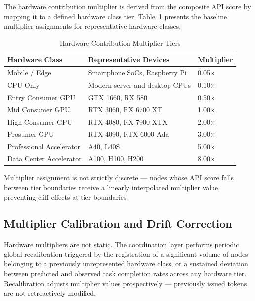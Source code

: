 \documentclass[12pt]{article}
\begin{document}
The hardware contribution multiplier is derived from the composite API score by mapping it to a defined hardware class tier. Table~\ref{tab:multipliers} presents the baseline multiplier assignments for representative hardware classes.

\begin{table}[h]
\centering
\caption{Hardware Contribution Multiplier Tiers}
\label{tab:multipliers}
\begin{tabular}{@{}lll@{}}
\toprule
\textbf{Hardware Class} & \textbf{Representative Devices} & \textbf{Multiplier} \\
\midrule
Mobile / Edge           & Smartphone SoCs, Raspberry Pi   & 0.05$\times$ \\
CPU Only                & Modern server and desktop CPUs  & 0.10$\times$ \\
Entry Consumer GPU      & GTX 1660, RX 580                & 0.50$\times$ \\
Mid Consumer GPU        & RTX 3060, RX 6700 XT            & 1.00$\times$ \\
High Consumer GPU       & RTX 4080, RX 7900 XTX           & 2.00$\times$ \\
Prosumer GPU            & RTX 4090, RTX 6000 Ada          & 3.00$\times$ \\
Professional Accelerator & A40, L40S                      & 5.00$\times$ \\
Data Center Accelerator & A100, H100, H200                & 8.00$\times$ \\
\bottomrule
\end{tabular}
\end{table}

Multiplier assignment is not strictly discrete — nodes whose API score falls between tier boundaries receive a linearly interpolated multiplier value, preventing cliff effects at tier boundaries.

\subsection{Multiplier Calibration and Drift Correction}

Hardware multipliers are not static. The coordination layer performs periodic global recalibration triggered by the registration of a significant volume of nodes belonging to a previously unrepresented hardware class, or a sustained deviation between predicted and observed task completion rates across any hardware tier. Recalibration adjusts multiplier values prospectively — previously issued tokens are not retroactively modified.
\end{document}
